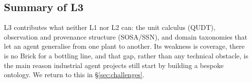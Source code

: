\subsection{Summary of L3}

L3 contributes what neither L1 nor L2 can: the unit calculus (QUDT), observation
and provenance structure (SOSA/SSN), and domain taxonomies that let an agent
generalise from one plant to another. Its weakness is coverage, there is no
Brick for a bottling line, and that gap, rather than any technical obstacle, is
the main reason industrial agent projects still start by building a bespoke
ontology. We return to this in \S\ref{sec:challenges}.
